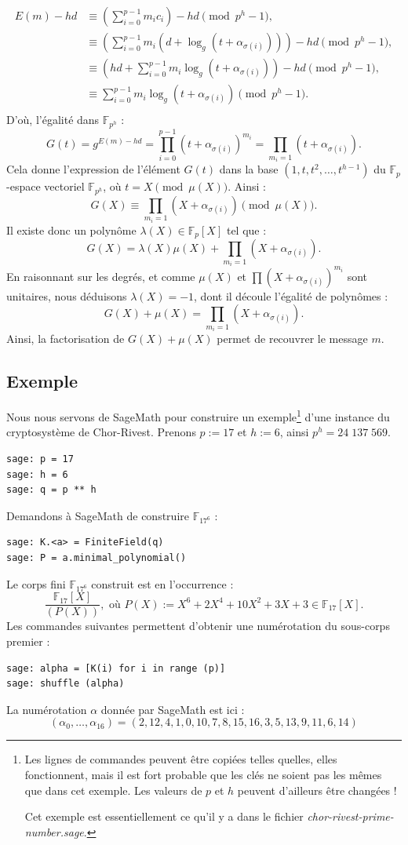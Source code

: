 \documentclass[a4paper, titlepage, 11pt]{article}
\theoremstyle{definition}
\theoremstyle{remark}
\def\gf #1{\mathbb{F}_{#1}}
\begin{document}
\begin{align*}
E(m) - hd &\equiv \left(\sum_{i=0}^{p-1} m_ic_i\right) - hd \pmod{p^h-1}, \\
&\equiv \left(\sum_{i=0}^{p-1} m_i\left(d + \log_g\left(t + \alpha_{\sigma(i)}\right)\right)\right) - hd \pmod{p^h-1}, \\
&\equiv \left(hd + \sum_{i=0}^{p-1} m_i\log_g\left(t + \alpha_{\sigma(i)}\right)\right) - hd \pmod{p^h-1}, \\
&\equiv  \sum_{i=0}^{p-1} m_i\log_g\left(t + \alpha_{\sigma(i)}\right) \pmod{p^h-1}. \\
\end{align*}
D'où, l'égalité dans $\gf{p^h}$ :
$$G(t) = g^{E(m) - hd} = \prod_{i=0}^{p-1} \left(t+\alpha_{\sigma(i)}\right)^{m_i} = \prod_{m_i = 1} \left(t+\alpha_{\sigma(i)}\right).$$
Cela donne l'expression de l'élément $G(t)$ dans la base $(1,t,t^2, \dots, t^{h-1})$ du $\gf{p}$-espace vectoriel $\gf{p^h}$, où $t = X \pmod{\mu(X)}$. Ainsi :
$$G(X) \equiv \prod_{m_i = 1} \left(X+\alpha_{\sigma(i)}\right) \pmod{\mu(X)}.$$
Il existe donc un polynôme $\lambda(X) \in \gf{p}[X]$ tel que : $$G(X) = \lambda(X) \mu(X) + \prod_{m_i = 1} \left(X+\alpha_{\sigma(i)}\right).$$
En raisonnant sur les degrés, et comme $\mu(X)$ et $\prod \left(X+\alpha_{\sigma(i)}\right)^{m_i}$ sont unitaires, nous déduisons  $\lambda(X) = -1$, dont il découle l'égalité de polynômes :
$$G(X) + \mu(X) = \prod_{m_i = 1} \left(X+\alpha_{\sigma(i)}\right).$$
Ainsi, la factorisation de $G(X)+\mu(X)$ permet de recouvrer le message $m$.

\subsection{Exemple}
Nous nous servons de SageMath pour construire un exemple\footnote{Les lignes de commandes peuvent être copiées telles quelles, elles fonctionnent, mais il est fort probable que les clés ne soient pas les mêmes que dans cet exemple. Les valeurs de $p$ et $h$ peuvent d'ailleurs être changées !

Cet exemple est essentiellement ce qu'il y a dans le fichier \textit{chor-rivest-prime-number.sage}.} d'une instance du cryptosystème de Chor-Rivest. Prenons $p := 17$ et $h := 6$, ainsi $p^h = 24\;137\;569$.
\begin{verbatim}
sage: p = 17
sage: h = 6
sage: q = p ** h
\end{verbatim}
Demandons à SageMath de construire $\gf{17^6}$ :
\begin{verbatim}
sage: K.<a> = FiniteField(q)
sage: P = a.minimal_polynomial()
\end{verbatim}
Le corps fini $\gf{17^6}$ construit est en l’occurrence :
$$\frac{\gf{17}[X]}{(P(X))}, \text{ où } P(X) := X^6 + 2X^4 + 10 X^2 +3X +3\in  \gf{17}[X].$$
Les commandes suivantes permettent d'obtenir une numérotation du sous-corps premier :
\begin{verbatim}
sage: alpha = [K(i) for i in range (p)]
sage: shuffle (alpha)
\end{verbatim}
La numérotation $\alpha$ donnée par SageMath est ici :
$$(\alpha_0, \dots, \alpha_{16}) = (2, 12, 4, 1, 0, 10, 7, 8, 15, 16, 3, 5, 13, 9, 11, 6, 14)$$
\end{document}
